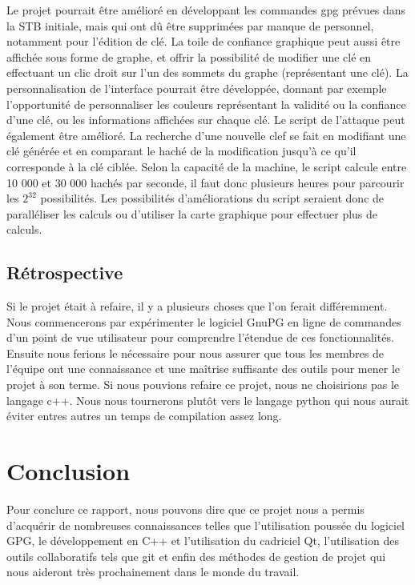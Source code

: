 \documentclass{../res/univ-projet}
\begin{document}
    Le projet pourrait être amélioré en développant les commandes gpg prévues dans la STB initiale, mais qui ont dû être supprimées par manque de personnel, notamment pour l'édition de clé. 
    La toile de confiance graphique peut aussi être affichée sous forme de graphe, et offrir la possibilité de modifier une clé en effectuant un clic droit sur l'un des sommets du graphe (représentant une clé).
    La personnalisation de l'interface pourrait être développée, donnant par exemple l'opportunité de personnaliser les couleurs représentant la validité ou la confiance d'une clé, ou les informations affichées sur chaque clé.
    Le script de l'attaque peut également être amélioré. La recherche d'une nouvelle clef se fait en modifiant une clé générée et en comparant le haché de la modification jusqu'à ce qu'il corresponde à la clé ciblée. Selon la capacité de la machine, le script calcule entre 10 000 et 30 000 hachés par seconde, il faut donc plusieurs heures pour parcourir les $2^{32}$ possibilités. Les possibilités d'améliorations du script seraient donc de paralléliser les calculs ou d'utiliser la carte graphique pour effectuer plus de calculs.

  \subsection{Rétrospective}
	Si le projet était à refaire, il y a plusieurs choses que l'on ferait différemment. Nous commencerons par expérimenter le logiciel GnuPG en ligne de commandes d'un point de vue utilisateur pour comprendre l'étendue de ces fonctionnalités. Ensuite nous ferions le nécessaire pour nous assurer que tous les membres de l'équipe ont une connaissance et une maîtrise suffisante des outils pour mener le projet à son terme.
	Si nous pouvions refaire ce projet, nous ne choisirions pas le langage c++. Nous nous tournerons plutôt vers le langage python qui nous aurait éviter entres autres un temps de compilation assez long.

\section{Conclusion}

	Pour conclure ce rapport, nous pouvons dire que ce projet nous a permis d'acquérir de nombreuses connaissances telles que l'utilisation poussée du logiciel GPG, le développement en C++ et l'utilisation du cadriciel Qt, l'utilisation des outils collaboratifs tels que git et enfin des méthodes de gestion de projet qui nous aideront très prochainement dans le monde du travail.
\end{document}
